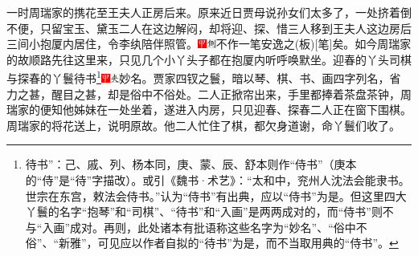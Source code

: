 一时周瑞家的携花至王夫人正房后来。原来近日贾母说孙女们太多了，一处挤着倒不便，只留宝玉、黛玉二人在这边解闷，却将迎、探、惜三人移到王夫人这边房后三间小抱厦内居住，令李纨陪伴照管。{{\includegraphics[width=3mm]{../Images/00002}\includegraphics[width=3mm]{../Images/00011}\footnotesize \kaishu 不作一笔安逸之{(板)}{[}笔{]}矣。}}如今周瑞家的故顺路先往这里来，只见几个小丫头子都在抱厦内听呼唤默坐。迎春的丫头司棋与探春的丫鬟待书\footnote{待书”：己、戚、列、杨本同，庚、蒙、辰、舒本则作“侍书”（庚本的“侍”是“待”字描改）。或引《魏书·术艺》：“太和中，兖州人沈法会能隶书。世宗在东宫，敕法会侍书。”认为“侍书”有出典，应以“侍书”为是。但这里四大丫鬟的名字“抱琴”和“司棋”、“待书”和“入画”是两两成对的，而“侍书”则不与“入画”成对。再则，此处诸本有批语称这些名字为“妙名”、“俗中不俗”、“新雅”，可见应以作者自拟的“待书”为是，而不当取用典的“侍书”。}{\includegraphics[width=3mm]{../Images/00002}\includegraphics[width=3mm]{../Images/00012}\footnotesize \kaishu 妙名。贾家四钗之鬟，暗以琴、棋、书、画四字列名，省力之甚，醒目之甚，却是俗中不俗处。}二人正掀帘出来，手里都捧着茶盘茶钟，周瑞家的便知他姊妹在一处坐着，遂进入内房，只见迎春、探春二人正在窗下围棋。周瑞家的将花送上，说明原故。他二人忙住了棋，都欠身道谢，命丫鬟们收了。

